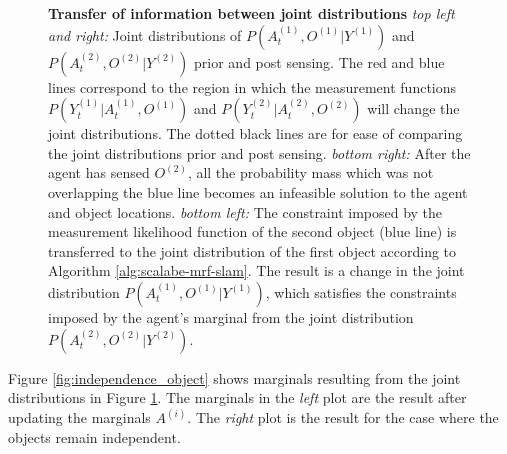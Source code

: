 \begin{figure}
  \centering
  \caption{\textbf{Transfer of information between joint distributions} \textit{top left and right:} Joint distributions of 
   $P(A^{(1)}_t,O^{(1)}|Y^{(1)})$ and $P(A^{(2)}_t,O^{(2)}|Y^{(2)})$ prior and post sensing. The red and blue lines correspond 
  to the region in which the measurement functions $P(Y^{(1)}_{t}|A^{(1)}_t,O^{(1)})$ and $P(Y^{(2)}_{t}|A^{(2)}_t,O^{(2)})$ will change the joint distributions.
  The dotted black lines are for ease of comparing the joint distributions prior and post sensing.
  \textit{bottom right:}  After the agent has sensed $O^{(2)}$, all the probability mass which was not overlapping the blue line becomes an infeasible
  solution to the agent and object locations. \textit{bottom left:} The constraint imposed by the measurement likelihood function of the second object
  (blue line) is transferred to the joint distribution of the first object according to Algorithm \ref{alg:scalabe-mrf-slam}.
  The result is a change in the joint distribution  $P(A^{(1)}_t,O^{(1)}|Y^{(1)})$, which satisfies the constraints 
  imposed by the agent's marginal from the joint distribution $P(A^{(2)}_t,O^{(2)}|Y^{(2)})$.}
  \label{fig:transfer_information}
\end{figure}

Figure \ref{fig:independence_object} shows marginals resulting from the joint distributions in Figure \ref{fig:transfer_information}. The marginals in
the \textit{left} plot are the result after updating the marginals $A^{(i)}$. The \textit{right} plot is the result for the case where the objects
remain independent. 

